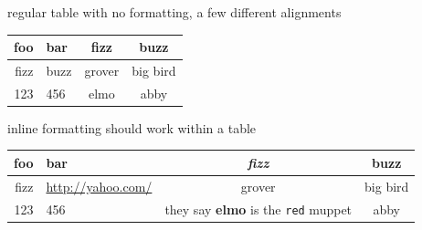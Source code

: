 

regular table with no formatting, a few different alignments


\begin{center}
\begin{tabular}{r l c c}
  foo & bar & fizz & buzz \\
  \hline
  fizz & buzz & grover & big bird \\
  123 & 456 & elmo & abby \\
\end{tabular}
\end{center}


inline formatting should work within a table


\begin{center}
\begin{tabular}{r l c c}
  foo & bar & \emph{fizz} & buzz \\
  \hline
  fizz & \url{http://yahoo.com/} & grover & big bird \\
  123 & 456 & they say \textbf{elmo} is the \verb|red|  muppet & abby \\
\end{tabular}
\end{center}